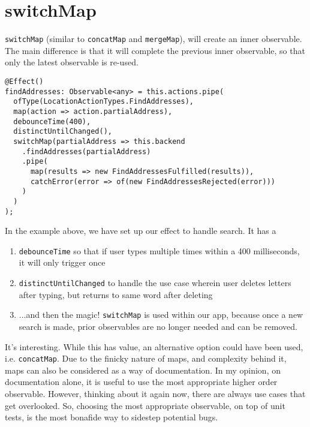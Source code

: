 \section{switchMap}
\lstinline{switchMap} (similar to \lstinline{concatMap} and \lstinline{mergeMap}),
will create an inner observable. The main difference is that it will complete 
the previous inner observable, so that only the latest observable is re-used. 

\begin{lstlisting}[caption=search-bar.component.ts]
@Effect()
findAddresses: Observable<any> = this.actions.pipe(
  ofType(LocationActionTypes.FindAddresses),
  map(action => action.partialAddress),
  debounceTime(400),
  distinctUntilChanged(),
  switchMap(partialAddress => this.backend
    .findAddresses(partialAddress)
    .pipe(
      map(results => new FindAddressesFulfilled(results)),
      catchError(error => of(new FindAddressesRejected(error)))
    )
  )
);  
\end{lstlisting}
 
In the example above, we have set up our effect to handle search. It has a 
\begin{enumerate}
  \item \lstinline{debounceTime} so that if user types multiple times within
  a 400 milliseconds, it will only trigger once
  \item \lstinline{distinctUntilChanged} to handle the use case wherein user 
  deletes letters after typing, but returns to same word after deleting
  \item ...and then the magic! \lstinline{switchMap} is used within our app,
  because once a new search is made, prior observables are no longer needed 
  and can be removed. 
\end{enumerate}

It's interesting. While this has value, an alternative option could have been 
used, i.e. \lstinline{concatMap}. Due to the finicky nature of maps, and 
complexity behind it, maps can also be considered as a way of documentation.
In my opinion, on documentation alone, it is useful to use the most appropriate 
higher order observable. However, thinking about it again now, there are always 
use cases that get overlooked. So, choosing the most appropriate observable, on 
top of unit tests, is the most bonafide way to sidestep potential bugs.


